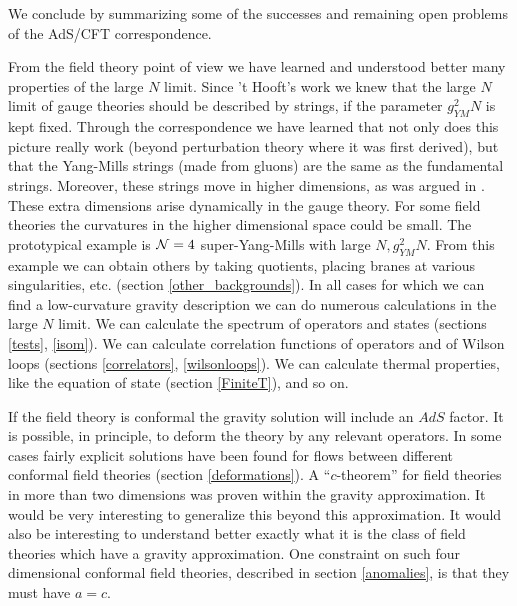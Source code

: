 \label{summary}

We conclude by summarizing some of the successes and remaining 
open problems  of the AdS/CFT correspondence.

From the field theory point of view we have learned and understood
better many properties
of the large $N$ limit. Since 't Hooft's work \cite{'tHooft:1974jz}
 we knew 
that the large $N$ limit of gauge theories should be described
by strings, if the parameter $g_{YM}^2 N$ is kept fixed. 
Through the correspondence we have learned that not only does this
picture really work (beyond perturbation theory where it was first
derived), but that the Yang-Mills strings (made from gluons) are the same
as the fundamental strings. 
 Moreover, these strings move in higher
dimensions, as was argued in \cite{Polyakov:1997tj}. 
These extra dimensions arise dynamically in the gauge theory. 
For some field theories the curvatures in the higher dimensional space
could be small. The prototypical example is ${\cal N} = 4$ 
super-Yang-Mills with large $N, g_{YM}^2 N$. 
From this example we can obtain others by taking 
quotients, placing branes at various singularities, etc. (section 
\ref{other_backgrounds}). 
In all cases for which we can find a low-curvature gravity description we 
can do numerous calculations in the large $N$ limit. 
We can calculate the spectrum of operators
and states (sections \ref{tests}, \ref{isom}).
We can calculate correlation functions of operators and of 
Wilson loops (sections \ref{correlators}, \ref{wilsonloops}). 
We can calculate thermal properties, like the equation of state 
(section \ref{FiniteT}), and so on.

If the field theory is conformal the gravity solution will include
an $AdS$ factor.   
It is possible, in principle, to deform the theory by any
relevant operators.
In some cases fairly explicit solutions have been found for 
flows between different conformal field theories 
(section \ref{deformations}). A ``$c$-theorem'' for field theories in
more than two dimensions was
proven within the gravity approximation. It would be very interesting
to generalize this beyond this approximation. 
It would also be interesting to understand better 
exactly what it is the class of field
theories which have a gravity approximation. One constraint on such
four dimensional conformal
field theories, described in section \ref{anomalies},
is that they must have $a=c$.

